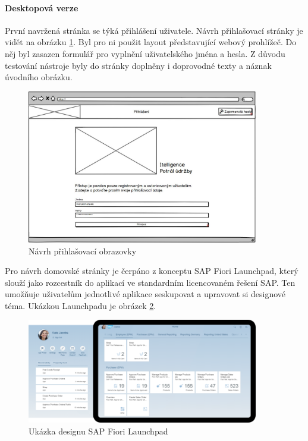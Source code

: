 \documentclass[thesis=M,czech]{FITthesis}[2012/06/26]
\begin{document}
\paragraph{Desktopová verze}
První navržená stránka se týká přihlášení uživatele. Návrh přihlašovací stránky je vidět na obrázku \ref{img:bal_login_desktop}. Byl pro ni použit layout představující webový prohlížeč. Do něj byl zasazen formulář pro vyplnění uživatelského jména a hesla. Z důvodu testování nástroje byly do stránky doplněny i doprovodné texty a náznak úvodního obrázku. 
\begin{figure}[H]
	\centering
	\includegraphics[width=0.9\textwidth]{images/bal_login}
	\caption{Návrh přihlašovací obrazovky}
	\label{img:bal_login_desktop}
\end{figure}
Pro návrh domovské stránky je čerpáno z konceptu SAP Fiori Launchpad, který slouží jako rozcestník do aplikací ve standardním licencovaném řešení SAP. Ten umožňuje uživatelům jednotlivé aplikace seskupovat a upravovat si designové téma. Ukázkou Launchpadu je obrázek \ref{img:fiori_launchpad}. 
\begin{figure}[H]
	\centering
	\includegraphics[width=0.9\textwidth]{images/fiori_launchpad}
	\caption{Ukázka designu SAP Fiori Launchpad}
	\label{img:fiori_launchpad}
\end{figure}
\end{document}
